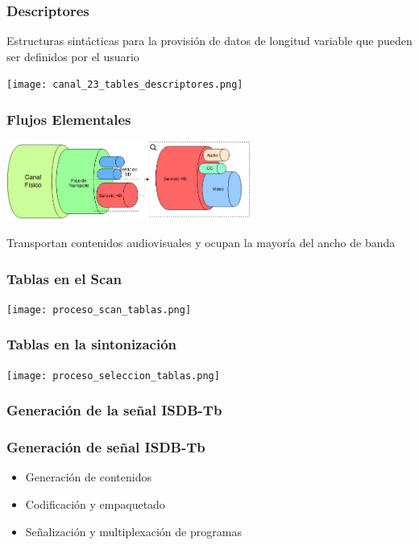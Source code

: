 \documentclass[a4paper,11pt]{beamer}
\begin{document}
			\begin{frame}
				\frametitle{Descriptores}
				Estructuras sintácticas para la provisión de datos de longitud variable que pueden ser definidos por el usuario
				\begin{center}
				\texttt{[image: canal\_23\_tables\_descriptores.png]}
				\end{center}
			\end{frame}

			\begin{frame}
				\frametitle{Flujos Elementales}
				\begin{center}
					\includegraphics[width=8cm]{cable_flujo_mpeg.png}
				\end{center}
					Transportan contenidos audiovisuales y ocupan la mayoría del ancho de banda
			\end{frame}
			

			\begin{frame}
				\frametitle{Tablas en el Scan}
					\begin{center}
						\texttt{[image: proceso\_scan\_tablas.png]}
					\end{center}
			\end{frame}

			\begin{frame}
				\frametitle{Tablas en la sintonización}
					\begin{center}
						\texttt{[image: proceso\_seleccion\_tablas.png]}
					\end{center}
			\end{frame}
			
		\subsubsection{Generación de la señal ISDB-Tb}

			\begin{frame}
				\frametitle{Generación de señal ISDB-Tb}
				\begin{itemize}
					\item Generación de contenidos
					\item Codificación y empaquetado
					\item Señalización y multiplexación de programas
				\end{itemize}
			\end{frame}
\end{document}
